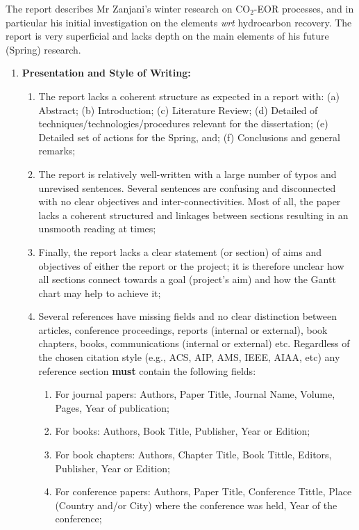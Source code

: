 \documentclass[14pt,twoside]{report}
\newcommand{\wrt}{{\it wrt }}
\begin{document}
The report describes Mr Zanjani's winter research on CO$_{2}$-EOR processes, and in particular his initial investigation on the elements \wrt hydrocarbon recovery. The report is very superficial and lacks depth on the main elements of his future (Spring) research. 

\begin{enumerate}
%
    \item {\bf Presentation and Style of Writing:}
                \begin{enumerate}
                   \item The report lacks a coherent structure as expected in a report with: (a) Abstract; (b) Introduction; (c) Literature Review; (d) Detailed of techniques/technologies/procedures relevant for the dissertation; (e) Detailed set of actions for the Spring, and; (f) Conclusions and general remarks;  
                   \item The report is relatively well-written with a large number of typos and unrevised sentences. Several sentences are confusing and disconnected with no clear objectives and inter-connectivities. Most of all, the paper lacks a coherent structured and linkages between sections resulting in an unsmooth reading at times;
                   \item Finally, the report lacks a clear statement (or section) of aims and objectives of either the report or the project; it is therefore unclear how all sections connect towards a goal (project's aim) and how the Gantt chart may help to achieve it;
                   \item Several references have missing fields and no clear distinction between articles, conference proceedings, reports (internal or external), book chapters, books, communications (internal or external) etc.  Regardless of the chosen citation style (e.g., ACS, AIP, AMS, IEEE, AIAA, etc) any reference section {\bf must} contain the following fields: 
                      \begin{enumerate}
                         \item For journal papers: Authors, Paper Title, Journal Name, Volume, Pages, Year of publication;
                         \item For books: Authors, Book Title, Publisher, Year or Edition;
                         \item For book chapters: Authors, Chapter Title, Book Tittle, Editors, Publisher, Year or Edition;
                         \item For conference papers: Authors, Paper Title, Conference Tittle, Place (Country and/or City) where the conference was held, Year of the conference;

\end{enumerate}
\end{enumerate}
\end{enumerate}
\end{document}
